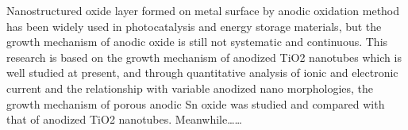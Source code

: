 \begin{abstract}

通过阳极氧化的方法在金属表面形成纳米结构的氧化层已经被广泛用于光催化和储能材料等领域，但是阳极氧化物生长机理的研究仍缺乏系统性和连续性。本课题基于目前研究较完善的阳极氧化TiO2纳米管的生长机理，通过定量分析离子电流和电子电流等与多变的阳极氧化纳米形貌的关系，研究和建立多孔阳极氧化Sn的生长模型，并指出了两者的不同点，同时……


\end{abstract}




\begin{englishabstract}

Nanostructured oxide layer formed on metal surface by anodic oxidation method has been widely used in photocatalysis and energy storage materials, but the growth mechanism of anodic oxide is still not systematic and continuous. This research is based on the growth mechanism of anodized TiO2 nanotubes which is well studied at present, and through quantitative analysis of ionic and electronic current and the relationship with variable anodized nano morphologies, the growth mechanism of porous anodic Sn oxide was studied and compared with that of anodized TiO2 nanotubes. Meanwhile…… 


\end{englishabstract}